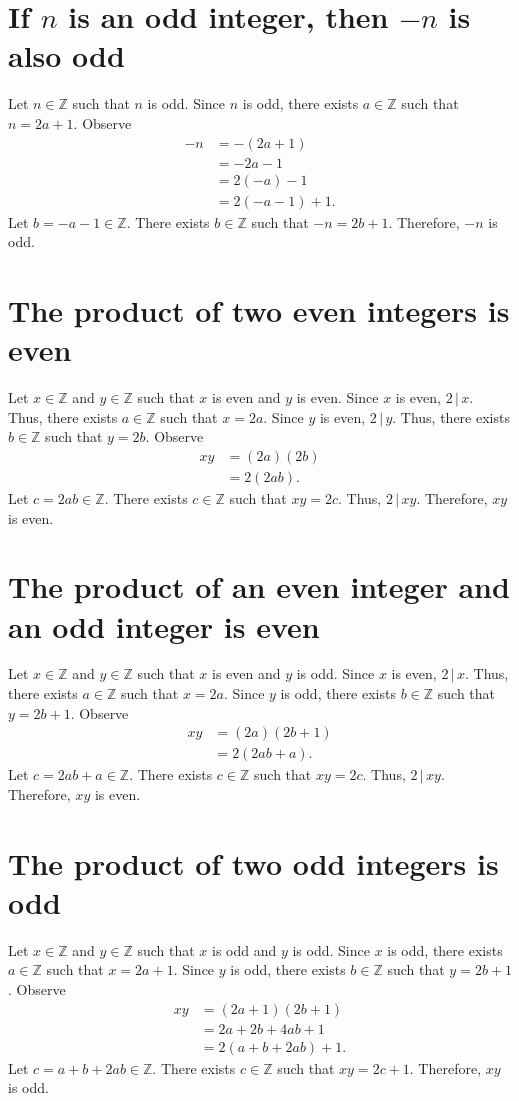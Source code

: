 \documentclass[12pt]{article}
\begin{document}
\section{If $n$ is an odd integer, then $-n$ is also odd}
Let $n\in\mathbb{Z}$ such that $n$ is odd. Since $n$ is odd, there exists $a\in\mathbb{Z}$ such that $n=2a+1$. Observe
\begin{align*}
-n
&=-(2a+1)\\
&=-2a-1\\
&=2(-a)-1\\
&=2(-a-1)+1.
\end{align*}
Let $b=-a-1\in\mathbb{Z}$. There exists $b\in\mathbb{Z}$ such that $-n=2b+1$. Therefore, $-n$ is odd.
\section{The product of two even integers is even}
Let $x\in\mathbb{Z}$ and $y\in\mathbb{Z}$ such that $x$ is even and $y$ is even. Since $x$ is even, $2\,|\,x$. Thus, there exists $a\in\mathbb{Z}$ such that $x=2a$. Since $y$ is even, $2\,|\,y$. Thus, there exists $b\in\mathbb{Z}$ such that $y=2b$. Observe
\begin{align*}
xy
&=(2a)(2b)\\
&=2(2ab).
\end{align*}
Let $c=2ab\in\mathbb{Z}$. There exists $c\in\mathbb{Z}$ such that $xy=2c$. Thus, $2\,|\,xy$. Therefore, $xy$ is even.
\section{The product of an even integer and an odd integer is even}
Let $x\in\mathbb{Z}$ and $y\in\mathbb{Z}$ such that $x$ is even and $y$ is odd. Since $x$ is even, $2\,|\,x$. Thus, there exists $a\in\mathbb{Z}$ such that $x=2a$. Since $y$ is odd, there exists $b\in\mathbb{Z}$ such that $y=2b+1$. Observe
\begin{align*}
xy
&=(2a)(2b+1)\\
&=2(2ab+a).
\end{align*}
Let $c=2ab+a\in\mathbb{Z}$. There exists $c\in\mathbb{Z}$ such that $xy=2c$. Thus, $2\,|\,xy$. Therefore, $xy$ is even.
\section{The product of two odd integers is odd}
Let $x\in\mathbb{Z}$ and $y\in\mathbb{Z}$ such that $x$ is odd and $y$ is odd. Since $x$ is odd, there exists $a\in\mathbb{Z}$ such that $x=2a+1$. Since $y$ is odd, there exists $b\in\mathbb{Z}$ such that $y=2b+1$. Observe
\begin{align*}
xy
&=(2a+1)(2b+1)\\
&=2a+2b+4ab+1\\
&=2(a+b+2ab)+1.
\end{align*}
Let $c=a+b+2ab\in\mathbb{Z}$. There exists $c\in\mathbb{Z}$ such that $xy=2c+1$. Therefore, $xy$ is odd.
\end{document}
